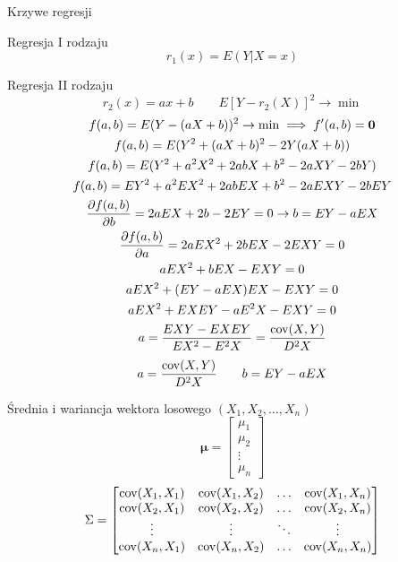 \documentclass{mp}
\begin{document}
\begin{frame}{Krzywe regresji}
\begin{block}{Regresja I rodzaju}
\[ r_1(x)=E(Y|X=x)  \]
\end{block}
\pause
\begin{block}{Regresja II rodzaju}
\[ r_2(x)=ax+b \qquad E\left[Y-r_2(X)\right]^2\to\min \]
{
	\footnotesize
	\begin{gather*}
	f(a,b)=E(Y-(aX+b))^2\to\min \implies f'(a,b)=\bm{0} \\
	f(a,b)=E(Y^2+(aX+b)^2-2Y(aX+b))\\
	f(a,b)=E(Y^2+a^2X^2+2abX+b^2-2aXY-2bY)\\
	f(a,b)=EY^2+a^2EX^2+2abEX+b^2-2aEXY-2bEY \\
	\frac{\partial f(a,b)}{\partial b}=2aEX+2b-2EY=0 \to b=EY-aEX \\
	\frac{\partial f(a,b)}{\partial a}=2aEX^2+2bEX-2EXY=0 \\
	aEX^2+bEX-EXY=0 \\
	aEX^2+(EY-aEX)EX-EXY=0 \\
	aEX^2+EXEY-aE^2X-EXY=0 \\
	a=\frac{EXY-EXEY}{EX^2-E^2X}=\frac{\operatorname{cov}(X,Y)}{D^2X} \\
	\end{gather*}
}
\pause
\[ a=\frac{\operatorname{cov}(X,Y)}{D^2X} \qquad b=EY-aEX \]
\end{block}
\end{frame}
\begin{frame}{Średnia i wariancja wektora losowego $(X_1,X_2,\ldots,X_n)$}
\[ \bm{\mu}=\begin{bmatrix} \mu_1 \\ \mu_2 \\ \vdots \\ \mu_n \end{bmatrix} \]
\[ \Sigma=\begin{bmatrix}
\operatorname{cov}(X_1,X_1) & \operatorname{cov}(X_1,X_2) & \ldots & \operatorname{cov}(X_1,X_n) \\
\operatorname{cov}(X_2,X_1) & \operatorname{cov}(X_2,X_2) & \ldots & \operatorname{cov}(X_2,X_n) \\
\vdots & \vdots & \ddots & \vdots \\
\operatorname{cov}(X_n,X_1) & \operatorname{cov}(X_n,X_2) & \ldots & \operatorname{cov}(X_n,X_n) \\
\end{bmatrix} \]
\end{frame}


\end{document}
